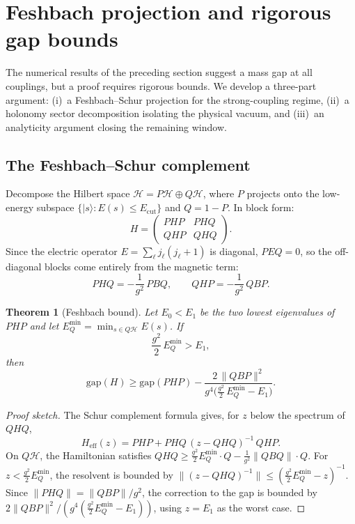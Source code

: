 \documentclass[12pt,a4paper]{article}
\newtheorem{theorem}{Theorem}[section]
\begin{document}
\section{Feshbach projection and rigorous gap bounds}\label{sec:feshbach}

The numerical results of the preceding section suggest a mass gap at all couplings, but a proof requires rigorous bounds. We develop a three-part argument: (i)~a Feshbach--Schur projection for the strong-coupling regime, (ii)~a holonomy sector decomposition isolating the physical vacuum, and (iii)~an analyticity argument closing the remaining window.

\subsection{The Feshbach--Schur complement}

Decompose the Hilbert space $\mathcal{H}=P\mathcal{H}\oplus Q\mathcal{H}$, where $P$ projects onto the low-energy subspace $\{|s\rangle : E(s)\le E_{\mathrm{cut}}\}$ and $Q=1-P$. In block form:
\begin{equation}
H = \begin{pmatrix} PHP & PHQ \\ QHP & QHQ \end{pmatrix}.
\end{equation}
Since the electric operator $E=\sum_\ell j_\ell(j_\ell+1)$ is diagonal, $PEQ=0$, so the off-diagonal blocks come entirely from the magnetic term:
\begin{equation}
PHQ = -\frac{1}{g^2}\,PBQ, \qquad QHP = -\frac{1}{g^2}\,QBP.
\end{equation}

\begin{theorem}[Feshbach bound]\label{thm:feshbach}
Let $E_0<E_1$ be the two lowest eigenvalues of $PHP$ and let $E_Q^{\min}=\min_{s\in Q\mathcal{H}}E(s)$. If
\begin{equation}\label{eq:feshbach_condition}
\frac{g^2}{2}\,E_Q^{\min} > E_1,
\end{equation}
then
\begin{equation}\label{eq:feshbach_bound}
\mathrm{gap}(H) \ge \mathrm{gap}(PHP) - \frac{2\,\|QBP\|^2}{g^4\bigl(\frac{g^2}{2}\,E_Q^{\min}-E_1\bigr)}.
\end{equation}
\end{theorem}

\begin{proof}[Proof sketch]
The Schur complement formula gives, for $z$ below the spectrum of $QHQ$,
\[
H_{\mathrm{eff}}(z) = PHP + PHQ\,(z-QHQ)^{-1}\,QHP.
\]
On $Q\mathcal{H}$, the Hamiltonian satisfies $QHQ\ge \frac{g^2}{2}E_Q^{\min}\cdot Q - \frac{1}{g^2}\|QBQ\|\cdot Q$. For $z<\frac{g^2}{2}E_Q^{\min}$, the resolvent is bounded by $\|(z-QHQ)^{-1}\|\le (\frac{g^2}{2}E_Q^{\min}-z)^{-1}$. Since $\|PHQ\|=\|QBP\|/g^2$, the correction to the gap is bounded by $2\|QBP\|^2/(g^4(\frac{g^2}{2}E_Q^{\min}-E_1))$, using $z=E_1$ as the worst case.
\end{proof}
\end{document}

